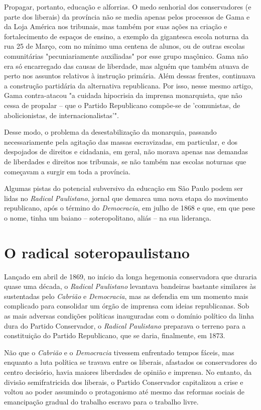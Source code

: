 Propagar, portanto, educação e alforrias. O medo senhorial dos
conservadores (e parte dos liberais) da província não se media apenas
pelos processos de Gama e da Loja América nos tribunais, mas também por
suas ações na criação e fortalecimento de espaços de ensino, a exemplo
da gigantesca escola noturna da rua 25 de Março, com no mínimo uma
centena de alunos, ou de outras escolas comunitárias "pecuniariamente
auxiliadas" por esse grupo maçônico. Gama não era só encarregado das
causas de liberdade, mas alguém que também atuava de perto nos assuntos
relativos à instrução primária. Além dessas frentes, continuava a
construção partidária da alternativa republicana. Por isso, nesse mesmo
artigo, Gama contra-atacou "a cuidada hipocrisia da imprensa
monarquista, que não cessa de propalar -- que o Partido Republicano
compõe-se de 'comunistas, de abolicionistas, de internacionalistas'".

Desse modo, o problema da desestabilização da monarquia, passando
necessariamente pela agitação das massas escravizadas, em particular, e
dos despojados de direitos e cidadania, em geral, não morava apenas nas
demandas de liberdades e direitos nos tribunais, se não também nas
escolas noturnas que começavam a surgir em toda a província.

Algumas pistas do potencial subversivo da educação em São Paulo podem
ser lidas no \emph{Radical Paulistano}, jornal que demarca uma nova
etapa do movimento republicano, após o término do \emph{Democracia}, em
julho de 1868 e que, em que pese o nome, tinha um baiano --
soteropolitano, aliás -- na sua liderança.

\section{O radical soteropaulistano}

Lançado em abril de 1869, no início da longa hegemonia conservadora que
duraria quase uma década, o \emph{Radical Paulistano} levantava
bandeiras bastante similares às sustentadas pelo \emph{Cabrião} e
\emph{Democracia}, mas as defendia em um momento mais complicado para
consolidar um órgão de imprensa com ideias republicanas. Sob as mais
adversas condições políticas inauguradas com o domínio político da linha
dura do Partido Conservador, o \emph{Radical Paulistano} preparava o
terreno para a constituição do Partido Republicano, que se daria,
finalmente, em 1873.

Não que o \emph{Cabrião} e o \emph{Democracia} tivessem enfrentado
tempos fáceis, mas enquanto a luta política se travava entre os
liberais, afastados os conservadores do centro decisório, havia maiores
liberdades de opinião e imprensa. No entanto, da divisão semifratricida
dos liberais, o Partido Conservador capitalizou a crise e voltou ao
poder assumindo o protagonismo até mesmo das reformas sociais de
emancipação gradual do trabalho escravo para o trabalho livre.

